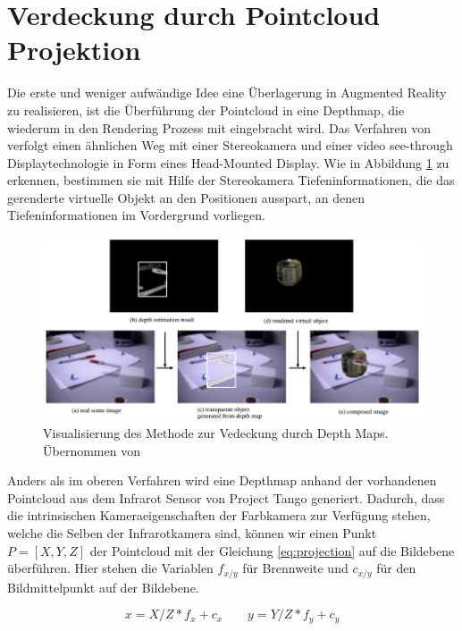 \section{Verdeckung durch Pointcloud Projektion} \label{sec:pc-projection}

Die erste und weniger aufwändige Idee eine Überlagerung in Augmented Reality zu realisieren, ist die Überführung der Pointcloud in eine Depthmap, die wiederum in den Rendering Prozess mit eingebracht wird. Das Verfahren von \citet{kanbara2000stereoscopic} verfolgt einen ähnlichen Weg mit einer Stereokamera und einer video see-through Displaytechnologie in Form eines Head-Mounted Display. Wie in Abbildung \ref{fig:stereo-depth-map} zu erkennen, bestimmen sie mit Hilfe der Stereokamera Tiefeninformationen, die das gerenderte virtuelle Objekt an den Positionen ausspart, an denen Tiefeninformationen im Vordergrund vorliegen. \\

\begin{figure}[h]
  \centering
	\includegraphics[width=1.0\textwidth]{content/images/methods/stereo-depth-map.png} 
  \caption{Visualisierung des Methode zur Vedeckung durch Depth Maps. Übernommen von \citet{kanbara2000stereoscopic}}
  \label{fig:stereo-depth-map}
\end{figure}

Anders als im oberen Verfahren wird eine Depthmap anhand der vorhandenen Pointcloud aus dem Infrarot Sensor von Project Tango generiert. Dadurch, dass die intrinsischen Kameraeigenschaften der Farbkamera zur Verfügung stehen, welche die Selben der Infrarotkamera sind, können wir einen Punkt \(P = [X, Y, Z]\) der Pointcloud mit der Gleichung \ref{eq:projection} auf die Bildebene überführen. Hier stehen die Variablen \(f_{x/y}\) für Brennweite und \(c_{x/y}\) für den Bildmittelpunkt auf der Bildebene. \citep{Tango90:online}

\begin{equation}\label{eq:projection}
x = X / Z * f_x + c_x
\qquad
y = Y / Z * f_y + c_y
\end{equation}

